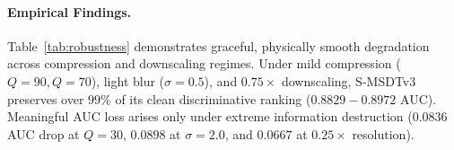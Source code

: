 \paragraph{Empirical Findings.}
Table~\ref{tab:robustness} demonstrates graceful, physically smooth degradation across compression and downscaling regimes. Under mild compression ($Q=90, Q=70$), light blur ($\sigma=0.5$), and $0.75\times$ downscaling, S-MSDTv3 preserves over $99\%$ of its clean discriminative ranking ($0.8829 - 0.8972$ AUC). Meaningful AUC loss arises only under extreme information destruction ($0.0836$ AUC drop at $Q=30$, $0.0898$ at $\sigma=2.0$, and $0.0667$ at $0.25\times$ resolution).


